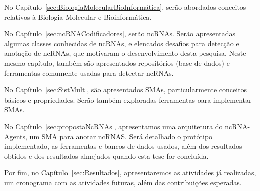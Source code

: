 No Capítulo~\ref{sec:BiologiaMolecularBioInformática}, serão abordados conceitos relativos à Biologia Molecular e Bioinformática.

No Capítulo~\ref{sec:ncRNACodificadores}, serão ncRNAs. Serão apresentadas algumas classes conhecidas de ncRNAs, e elencados desafios para detecção e anotação de ncRNAs, que motivaram o desenvolvimento desta pesquisa. Neste mesmo capítulo, também são apresentados repositórios (base de dados) e ferramentas comumente usadas para detectar ncRNAs.

No Capítulo~\ref{sec:SistMult}, são apresentados SMAs, particularmente conceitos básicos e propriedades. Serão também exploradas ferramentas oara implementar SMAs.

No Capítulo~\ref{sec:propostaNcRNAs}, apresentamos uma arquitetura do ncRNA-Agents, um SMA para anotar ncRNAS. Será detalhado o protótipo implementado, as ferramentas e bancos de dados usados, além dos resultados obtidos e dos resultados almejados quando esta tese for concluída.

Por fim, no Capítulo~\ref{sec:Resultados}, apresentaremos as atividades já realizadas, um cronograma com as atividades futuras, além das contribuições esperadas.